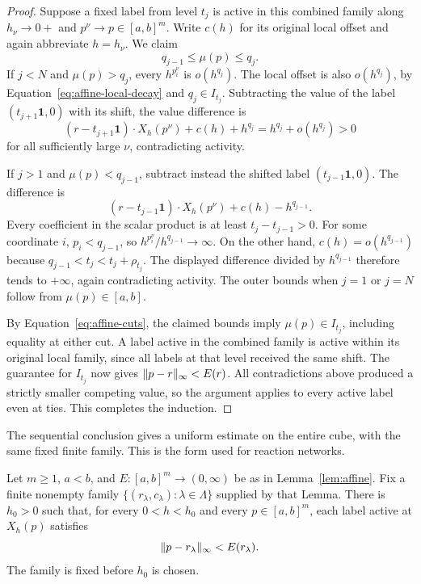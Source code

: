 \begin{proof}


Suppose a fixed label from level $t_j$ is active in this combined family
along $h_\nu\to0+$ and $p^\nu\to p\in[a,b]^m$.  Write $c(h)$ for
its original local offset and again abbreviate $h=h_\nu$.  We claim
\[
  q_{j-1}\leq\mu(p)\leq q_j.
\]
If $j<N$ and $\mu(p)>q_j$, every $h^{p_i^\nu}$ is $o(h^{q_j})$.
The local offset is also $o(h^{q_j})$, by
Equation~\eqref{eq:affine-local-decay} and $q_j\in I_{t_j}$.
Subtracting the value of the label
$(t_{j+1}\mathbf 1,0)$ with its shift, the value difference is
\[
  (r-t_{j+1}\mathbf 1)\cdot X_h(p^\nu)+c(h)+h^{q_j}
  =h^{q_j}+o(h^{q_j})>0
\]
for all sufficiently large $\nu$, contradicting activity.

If $j>1$ and $\mu(p)<q_{j-1}$, subtract instead the shifted
label $(t_{j-1}\mathbf 1,0)$.  The difference is
\[
  (r-t_{j-1}\mathbf 1)\cdot X_h(p^\nu)+c(h)-h^{q_{j-1}}.
\]
Every coefficient in the scalar product is at least
$t_j-t_{j-1}>0$.  For some coordinate $i$, $p_i<q_{j-1}$, so
$h^{p_i^\nu}/h^{q_{j-1}}\to\infty$.  On the other hand,
$c(h)=o(h^{q_{j-1}})$ because $q_{j-1}<t_j<t_j+\rho_{t_j}$.
The displayed difference divided by $h^{q_{j-1}}$ therefore tends to
$+\infty$, again contradicting activity.  The outer bounds when $j=1$
or $j=N$ follow from $\mu(p)\in[a,b]$.

By Equation~\eqref{eq:affine-cuts}, the claimed bounds imply
$\mu(p)\in I_{t_j}$, including equality at either cut.  A label active
in the combined family is active within its original local family,
since all labels at that level received the same shift.  The guarantee
for $I_{t_j}$ now gives $\lVert p-r\rVert_\infty<E(r)$.
All contradictions above produced a strictly smaller competing value,
so the argument applies to every active label even at ties.  This
completes the induction.
\end{proof}

The sequential conclusion gives a uniform estimate on the entire cube,
with the same fixed finite family. This is the form used for reaction
networks.

\begin{corollary}\label{cor:uniform-affine}
Let $m\ge1$, $a<b$, and $E:[a,b]^m\to(0,\infty)$ be as in
Lemma~\ref{lem:affine}. Fix a finite nonempty family
$\{(r_\lambda,c_\lambda):\lambda\in\Lambda\}$ supplied by that Lemma.
There is $h_0>0$ such that, for every $0<h<h_0$ and every
$p\in[a,b]^m$, each label active at $X_h(p)$ satisfies
\[
 \lVert p-r_\lambda\rVert_\infty<E(r_\lambda).
\]
The family is fixed before $h_0$ is chosen.
\end{corollary}

